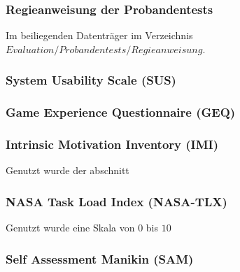 \documentclass[
	12pt,
	a4paper,
	bibtotoc,
	cleardoubleempty, 
	idxtotoc,
	ngerman,
	openright
	final,
	listof=nochaptergap,
	]{scrbook}
\begin{document}
\begin{appendices}
\subsubsection{Regieanweisung der Probandentests}
Im beiliegenden Datenträger im Verzeichnis $Evaluation/Probandentests/Regieanweisung$.

\subsubsection{System Usability Scale (SUS)}\label{sec:append_study_sus}



\subsubsection{Game Experience Questionnaire (GEQ)}\label{sec:append_study_xp}



\subsubsection{Intrinsic Motivation Inventory (IMI)}\label{sec:append_study_imi}

Genutzt wurde der abschnitt 


\subsubsection{NASA Task Load Index (NASA-TLX)}\label{sec:append_study_tlx}

Genutzt wurde eine Skala von $0$ bis $10$



\subsubsection{Self Assessment Manikin (SAM)}\label{sec:append_study_sam}


\end{appendices}
\end{document}
